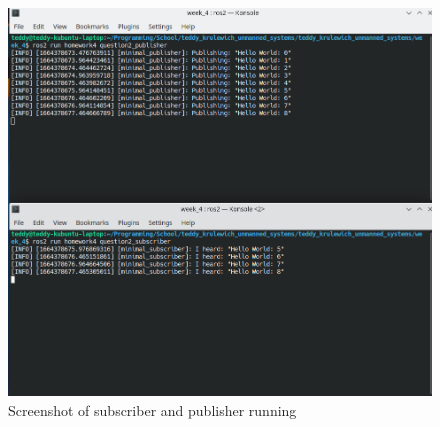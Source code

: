 \documentclass{article}
\begin{document}
\begin{figure}[H]
    \centering
    \includegraphics[width=\textwidth]{question2.png}
    \caption*{Screenshot of subscriber and publisher running}
\end{figure}
\end{document}
